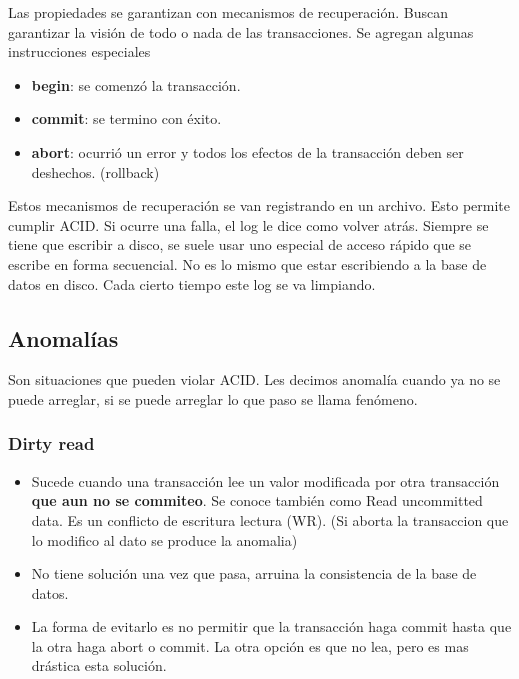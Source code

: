 Las propiedades se garantizan con mecanismos de recuperación. Buscan garantizar la visión de todo o nada de las transacciones. Se agregan algunas instrucciones especiales
\begin{itemize}
\item \textbf{begin}: se comenzó la transacción.
\item \textbf{commit}: se termino con éxito.
\item \textbf{abort}: ocurrió un error y todos los efectos de la transacción deben ser deshechos. (rollback)
\end{itemize}


Estos mecanismos de recuperación se van registrando en un archivo. Esto permite cumplir ACID. Si ocurre una falla, el log le dice como volver atrás. Siempre se tiene que escribir a disco, se suele usar uno especial de acceso rápido que se escribe en forma secuencial. No es lo mismo que estar escribiendo a la base de datos en disco. Cada cierto tiempo este log se va limpiando.

\subsection*{Anomalías}
Son situaciones que pueden violar ACID. Les decimos anomalía cuando ya no se puede arreglar, si se puede arreglar lo que paso se llama fenómeno.

\subsubsection*{Dirty read}
\begin{itemize}
\item Sucede cuando una transacción lee un valor modificada por otra transacción \textbf{que aun no se commiteo}. Se conoce también como Read uncommitted data. Es un conflicto de escritura lectura (WR). (Si aborta la transaccion que lo modifico al dato se produce la anomalia)
\item No tiene solución una vez que pasa, arruina la consistencia de la base de datos.
\item La forma de evitarlo es no permitir que la transacción haga commit hasta que la otra haga abort o commit. La otra opción es que no lea, pero es mas drástica esta solución.
\end{itemize}



